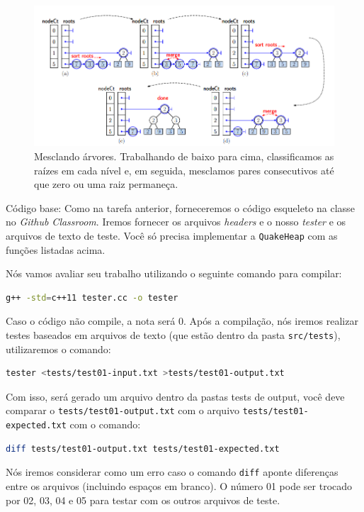\documentclass{article}
\begin{document}
\begin{figure}
    \centering
    \includegraphics[width = \linewidth]{figures/fig2.png}
    \caption{Mesclando árvores. Trabalhando de baixo para cima, classificamos as raízes em cada nível e, em seguida, mesclamos pares consecutivos até que zero ou uma raiz permaneça.}
    \label{fig:fig2}
\end{figure}

Código base: Como na tarefa anterior, forneceremos o código esqueleto na classe no \textit{Github Classroom}. Iremos fornecer os arquivos \textit{headers} e o nosso \textit{tester} e os arquivos de texto de teste. Você só precisa implementar a \texttt{QuakeHeap} com as funções listadas acima. 

Nós vamos avaliar seu trabalho utilizando o seguinte comando para compilar:
\begin{lstlisting}[language=bash]
g++ -std=c++11 tester.cc -o tester
\end{lstlisting}

Caso o código não compile, a nota será 0.
Após a compilação, nós iremos realizar testes baseados em arquivos de texto (que estão dentro da pasta \texttt{src/tests}), utilizaremos o comando:

\begin{lstlisting}[language=bash]
tester <tests/test01-input.txt >tests/test01-output.txt
\end{lstlisting}
    
Com isso, será gerado um arquivo dentro da pastas tests de output, você deve comparar o \texttt{tests/test01-output.txt} com o arquivo \texttt{tests/test01-expected.txt} com o comando:

\begin{lstlisting}[language=bash]
diff tests/test01-output.txt tests/test01-expected.txt
\end{lstlisting}

Nós iremos considerar como um erro caso o comando \texttt{diff} aponte diferenças entre os arquivos (incluindo espaços em branco). 
O número 01 pode ser trocado por 02, 03, 04 e 05 para testar com os outros arquivos de teste. 
\end{document}

